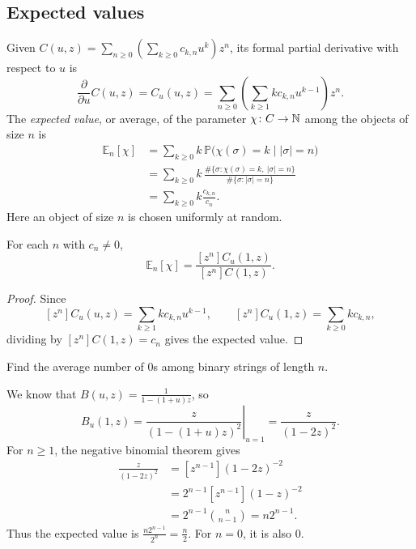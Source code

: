 \subsection{Expected values}
Given $\displaystyle C(u,z)=\sum_{n\ge0}\left(\sum_{k\ge0}c_{k,n}u^k\right)z^n$, its formal partial derivative with respect to $u$ is
\[
\frac{\partial}{\partial u}C(u,z)=C_u(u,z)
=\sum_{n\ge0}\left(\sum_{k\ge1}k c_{k,n}u^{k-1}\right)z^n.
\]
The \textit{expected value}, or average, of the parameter $\chi\colon C\to\mathbb{N}$ among the objects of size $n$ is
\begin{align*}
\mathbb E_n[\chi]
&=\sum_{k\ge0}k\,\mathbb P\bigl(\chi(\sigma)=k\mid |\sigma|=n\bigr)\\
&=\sum_{k\ge0}k\,
\frac{\#\{\sigma: \chi(\sigma)=k,\ |\sigma|=n\}}
{\#\{\sigma:|\sigma|=n\}}\\
&=\sum_{k\ge0}k\frac{c_{k,n}}{c_n}.
\end{align*}
Here an object of size $n$ is chosen uniformly at random.
\begin{proposition}
For each $n$ with $c_n\ne0$,
\[
\mathbb E_n[\chi]=\frac{[z^n]C_u(1,z)}{[z^n]C(1,z)}.
\]
\end{proposition}
\begin{proof}
Since
\[
[z^n]C_u(u,z)=\sum_{k\ge1}k c_{k,n}u^{k-1},
\qquad [z^n]C_u(1,z)=\sum_{k\ge0}k c_{k,n},
\]
dividing by $[z^n]C(1,z)=c_n$ gives the expected value.
\end{proof}
\begin{example}
Find the average number of $0$s among binary strings of length $n$.\par\medskip
We know that $\displaystyle B(u,z)=\frac1{1-(1+u)z}$, so
\[
B_u(1,z)=\left.\frac{z}{(1-(1+u)z)^2}\right|_{u=1}
=\frac z{(1-2z)^2}.
\]
For $n\ge1$, the negative binomial theorem gives
\begin{align*}
[z^n]\frac z{(1-2z)^2}
&=[z^{n-1}](1-2z)^{-2}\\
&=2^{n-1}[z^{n-1}](1-z)^{-2}\\
&=2^{n-1}\binom n{n-1}=n2^{n-1}.
\end{align*}
Thus the expected value is $\displaystyle\frac{n2^{n-1}}{2^n}=\frac n2$. For $n=0$, it is also $0$.
\end{example}
